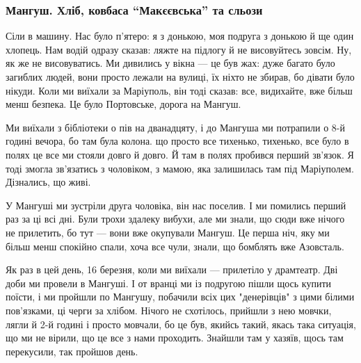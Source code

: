  
 
 
 
 

\subsubsection{Мангуш. Хліб, ковбаса \enquote{Макєєвська} та сльози}

Сіли в машину. Нас було п'ятеро: я з донькою, моя подруга з донькою й ще один
хлопець. Нам водій одразу сказав: ляжте на підлогу й не висовуйтесь зовсім. Ну,
як же не висовуватись. Ми дивились у вікна — це був жах: дуже багато було
загиблих людей, вони просто лежали на вулиці, їх ніхто не збирав, бо дівати
було нікуди. Коли ми виїхали за Маріуполь, він тоді сказав: все, видихайте, вже
більш менш безпека. Це було Портовське, дорога на Мангуш.

Ми виїхали з бібліотеки о пів на дванадцяту, і до Мангуша ми потрапили о 8-й
годині вечора, бо там була колона. що просто все тихенько, тихенько, все було в
полях це все ми стояли довго й довго. Й там в полях пробився перший зв'язок. Я
тоді змогла зв'язатись з чоловіком, з мамою, яка залишилась там під Маріуполем.
Дізнались, що живі.


У Мангуші ми зустріли друга чоловіка, він нас поселив. І ми помились перший раз
за ці всі дні. Були трохи здалеку вибухи, але ми знали, що сюди вже нічого не
прилетить, бо тут — вони вже окупували Мангуш. Це перша ніч, яку ми більш менш
спокійно спали, хоча все чули, знали, що бомблять вже Азовсталь.

Як раз в цей день, 16 березня, коли ми виїхали — прилетіло у драмтеатр. Дві
доби ми провели в Мангуші. І от вранці ми із подругою пішли щось купити поїсти,
і ми пройшли по Мангушу, побачили всіх цих "денерівців" з цими білими
пов’язками, ці черги за хлібом. Нічого не схотілось, прийшли з нею мовчки,
лягли й 2-й годині і просто мовчали, бо це був, якийсь такий, якась така
ситуація, що ми не вірили, що це все з нами проходить. Знайшли там у хазяїв,
щось там перекусили, так пройшов день.

